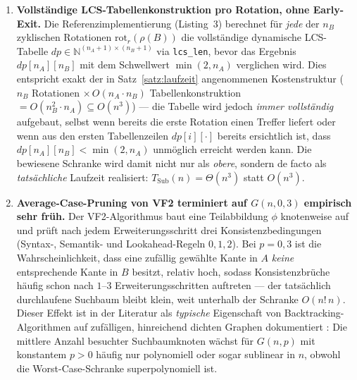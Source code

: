 \documentclass[a4paper,12pt]{article}
\theoremstyle{definition}
\begin{document}
\begin{enumerate}
	\item \textbf{Vollständige LCS-Tabellenkonstruktion pro Rotation, ohne Early-Exit.} Die Referenzimplementierung (Listing~3) berechnet für \emph{jede} der $n_B$ zyklischen Rotationen $\mathrm{rot}_r(\rho(B))$ die vollständige dynamische LCS-Tabelle $dp\in\mathbb{N}^{(n_A+1)\times(n_B+1)}$ via \texttt{lcs\_len}, bevor das Ergebnis $dp[n_A][n_B]$ mit dem Schwellwert $\min(2,n_A)$ verglichen wird. Dies entspricht exakt der in Satz~\ref{satz:laufzeit} angenommenen Kostenstruktur ($n_B$ Rotationen $\times\, O(n_A\cdot n_B)$ Tabellenkonstruktion $=O(n_B^2\cdot n_A)\subseteq O(n^3)$) — die Tabelle wird jedoch \emph{immer vollständig} aufgebaut, selbst wenn bereits die erste Rotation einen Treffer liefert oder wenn aus den ersten Tabellenzeilen $dp[i][\cdot]$ bereits ersichtlich ist, dass $dp[n_A][n_B] < \min(2,n_A)$ unmöglich erreicht werden kann. Die bewiesene Schranke wird damit nicht nur als \emph{obere}, sondern de facto als \emph{tatsächliche} Laufzeit realisiert: $T_{\text{Sub}}(n)=\Theta(n^3)$ statt $O(n^3)$.

	\item \textbf{Average-Case-Pruning von VF2 terminiert auf $G(n,0{,}3)$ empirisch sehr früh.} Der VF2-Algorithmus \cite{cordella2004} baut eine Teilabbildung $\phi$ knotenweise auf und prüft nach jedem Erweiterungsschritt drei Konsistenzbedingungen (Syntax-, Semantik- und Lookahead-Regeln $0,1,2$). Bei $p=0{,}3$ ist die Wahrscheinlichkeit, dass eine zufällig gewählte Kante in $A$ \emph{keine} entsprechende Kante in $B$ besitzt, relativ hoch, sodass Konsistenzbrüche häufig schon nach $1$--$3$ Erweiterungsschritten auftreten — der tatsächlich durchlaufene Suchbaum bleibt klein, weit unterhalb der Schranke $O(n!\,n)$. Dieser Effekt ist in der Literatur als \emph{typische} Eigenschaft von Backtracking-Algorithmen auf zufälligen, hinreichend dichten Graphen dokumentiert \cite{he2008,bonnici2013}: Die mittlere Anzahl besuchter Suchbaumknoten wächst für $G(n,p)$ mit konstantem $p>0$ häufig nur polynomiell oder sogar sublinear in $n$, obwohl die Worst-Case-Schranke superpolynomiell ist.


\end{enumerate}
\end{document}
